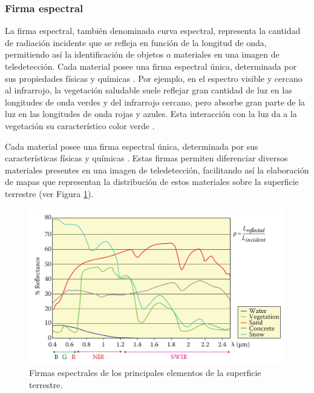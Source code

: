 \subsubsection{Firma espectral}

La firma espectral, también denominada curva espectral, representa la cantidad de radiación incidente que se refleja en función de la longitud de onda, permitiendo así la identificación de objetos o materiales en una imagen de teledetección. Cada material posee una firma espectral única, determinada por sus propiedades físicas y químicas \cite{tempfli2009principles}. Por ejemplo, en el espectro visible y cercano al infrarrojo, la vegetación saludable suele reflejar gran cantidad de luz en las longitudes de onda verdes y del infrarrojo cercano, pero absorbe gran parte de la luz en las longitudes de onda rojas y azules. Esta interacción con la luz da a la vegetación su característico color verde \cite{emery2017introduction}.

Cada material posee una firma espectral única, determinada por sus características físicas y químicas \cite{chuvieco2016fundamentals}. Estas firmas permiten diferenciar diversos materiales presentes en una imagen de teledetección, facilitando así la elaboración de mapas que representan la distribución de estos materiales sobre la superficie terrestre (ver Figura \ref{fig:FirmasEspectralesSuperficie}).

\begin{figure}[H]
    \begin{center}
        \includegraphics[width=1\textwidth]{Images/FirmasEspectralesSuperficie.png}
    \end{center}
    \caption{Firmas espectrales de los principales elementos de la superficie terrestre.}
    \label{fig:FirmasEspectralesSuperficie}
\end{figure}

